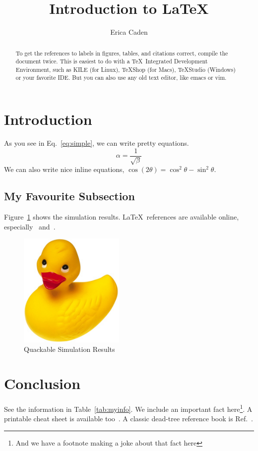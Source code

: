 \documentclass[11pt]{article}
\begin{document}
\title{Introduction to \LaTeX{}}
\author{Erica Caden}

\maketitle

\begin{abstract}
To get the references to labels in figures, tables, and citations correct, compile the document twice. This is easiest to do with a \TeX~Integrated Development Environment, such as KILE (for Linux), TeXShop (for Macs), TeXStudio (Windows) or your favorite IDE. But you can also use any old text editor, like emacs or vim.
\end{abstract}

\section{Introduction}
As you see in Eq.~\ref{eq:simple}, we can write pretty equations.
\begin{equation}
    \label{eq:simple}
    \alpha = \frac{1}{\sqrt{\beta}}
\end{equation}
We can also write nice inline equations, $\cos (2\theta) = \cos^2 \theta - \sin^2 \theta$.

\subsection{My Favourite Subsection}
Figure~\ref{fig:myfigure} shows the simulation results.  \LaTeX~references are available online, especially~\cite{wikibooks} and~\cite{stackexchange}.
\begin{figure}[htbp]
    \centering
    \includegraphics[width=2.0in]{duck.png}
    \caption{Quackable Simulation Results}
    \label{fig:myfigure}
\end{figure}

\section{Conclusion}
See the information in Table~\ref{tab:myinfo}. We include an important fact here\footnote{And we have a footnote making a joke about that fact here}.  A printable cheat sheet is available too~\cite{cheatsheet}.  A classic dead-tree reference book is Ref.~\cite{lamport94}.
\end{document}
